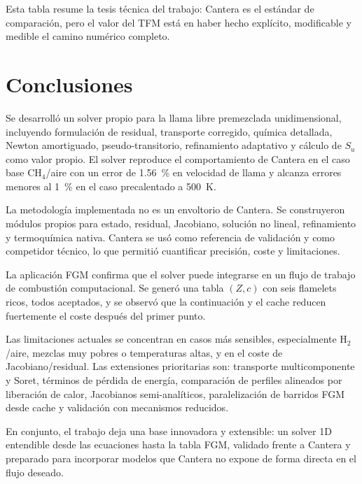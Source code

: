 \documentclass[12pt,a4paper]{article}
\begin{document}
Esta tabla resume la tesis técnica del trabajo: Cantera es el estándar de comparación, pero el valor del TFM está en haber hecho explícito, modificable y medible el camino numérico completo.

\section{Conclusiones}

Se desarrolló un solver propio para la llama libre premezclada unidimensional, incluyendo formulación de residual, transporte corregido, química detallada, Newton amortiguado, pseudo-transitorio, refinamiento adaptativo y cálculo de $S_u$ como valor propio. El solver reproduce el comportamiento de Cantera en el caso base CH$_4$/aire con un error de \SI{1.56}{\percent} en velocidad de llama y alcanza errores menores al \SI{1}{\percent} en el caso precalentado a \SI{500}{K}.

La metodología implementada no es un envoltorio de Cantera. Se construyeron módulos propios para estado, residual, Jacobiano, solución no lineal, refinamiento y termoquímica nativa. Cantera se usó como referencia de validación y como competidor técnico, lo que permitió cuantificar precisión, coste y limitaciones.

La aplicación FGM confirma que el solver puede integrarse en un flujo de trabajo de combustión computacional. Se generó una tabla $(Z,c)$ con seis flamelets ricos, todos aceptados, y se observó que la continuación y el cache reducen fuertemente el coste después del primer punto.

Las limitaciones actuales se concentran en casos más sensibles, especialmente H$_2$/aire, mezclas muy pobres o temperaturas altas, y en el coste de Jacobiano/residual. Las extensiones prioritarias son: transporte multicomponente y Soret, términos de pérdida de energía, comparación de perfiles alineados por liberación de calor, Jacobianos semi-analíticos, paralelización de barridos FGM desde cache y validación con mecanismos reducidos.

En conjunto, el trabajo deja una base innovadora y extensible: un solver 1D entendible desde las ecuaciones hasta la tabla FGM, validado frente a Cantera y preparado para incorporar modelos que Cantera no expone de forma directa en el flujo deseado.
\end{document}

